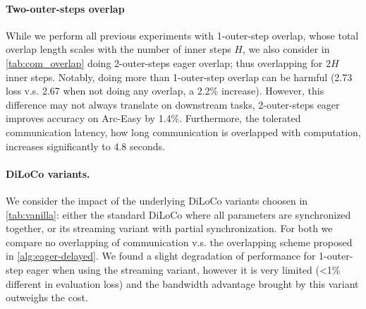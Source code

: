 \begin{table}[t]
\centering
{}
\caption{\textbf{DiLoCo variant comparison} for no communication overlapping v.s. our 1-outer-step eager overlapping when varying the underlying DiLoCo algorithms: either the standard DiLoCo \citep{douillard2023diloco} where all parameters are synchronized together, or its streaming variant \citep{douillard2025streamingdiloco} with partial synchronization.}
\label{tab:vanilla}
\end{table}




\paragraph{Two-outer-steps overlap} While we perform all previous experiments with 1-outer-step overlap, whose total overlap length scales with the number of inner steps $H$, we also consider in \autoref{tab:com_overlap} doing 2-outer-steps eager overlap; thus overlapping for $2H$ inner steps. Notably, doing more than 1-outer-step overlap can be harmful (2.73 loss v.s. 2.67 when not doing any overlap, a 2.2\% increase). However, this difference may not always translate on downstream tasks, 2-outer-steps eager improves accuracy on Arc-Easy \citep{clark2018arc} by 1.4\%. Furthermore, the tolerated communication latency, how long communication is overlapped with computation, increases significantly to 4.8 seconds.


\paragraph{DiLoCo variants.} We consider the impact of the underlying DiLoCo variants choosen in \autoref{tab:vanilla}: either the standard DiLoCo \citep{douillard2023diloco} where all parameters are synchronized together, or its streaming variant \citep{douillard2025streamingdiloco} with partial synchronization. For both we compare no overlapping of communication v.s. the overlapping scheme proposed in \autoref{alg:eager-delayed}. We found a slight degradation of performance for 1-outer-step eager when using the streaming variant, however it is very limited (<1\% different in evaluation loss) and the bandwidth advantage brought by this variant outweighs the cost.





